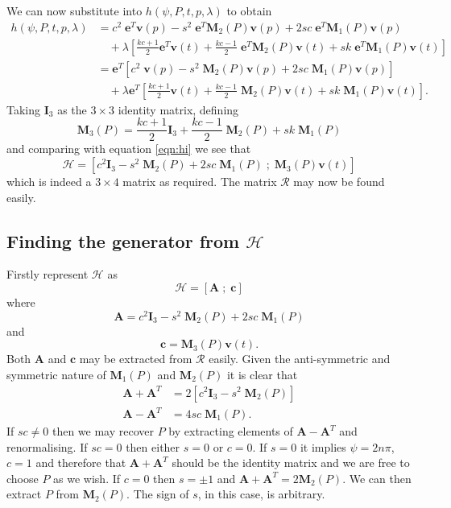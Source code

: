 We can now substitute into $h(\psi, P, t, p,\lambda)$ to obtain
\begin{align*}
h(\psi, P, t, p, \lambda) &= c^2\;\mathbf{e}^T\mathbf{v}(p) - s^2\;\mathbf{e}^T\mathbf{M}_2(P)\mathbf{v}(p) + 2sc\;\mathbf{e}^T\mathbf{M}_1(P)\mathbf{v}(p) \\
&\quad+ \lambda\left[ 
 \frac{kc+1}{2} \mathbf{e}^T\mathbf{v}(t) + \frac{kc-1}{2} \;\mathbf{e}^T\mathbf{M}_2(P)\mathbf{v}(t)
+ sk\;\mathbf{e}^T\mathbf{M}_1(P)\mathbf{v}(t)
 \right] \\
& = \mathbf{e}^T \left[ 
 c^2\;\mathbf{v}(p) - s^2\;\mathbf{M}_2(P)\mathbf{v}(p) + 2sc\;\mathbf{M}_1(P)\mathbf{v}(p) 
\right] \\
&\quad+ \lambda\mathbf{e}^T\left[ 
 \frac{kc+1}{2} \mathbf{v}(t) + \frac{kc-1}{2} \;\mathbf{M}_2(P)\mathbf{v}(t)
+ sk\;\mathbf{M}_1(P)\mathbf{v}(t)
 \right].
\end{align*}
Taking $\mathbf{I}_3$ as the $3\times3$ identity matrix, defining
\[
\mathbf{M}_3(P) = \frac{kc+1}{2} \mathbf{I}_3 
+ \frac{kc-1}{2} \;\mathbf{M}_2(P) + sk\;\mathbf{M}_1(P)
\]
and comparing with 
equation \ref{eqn:hi} we see that
\[
\mathcal{H} = \left[
 c^2\mathbf{I}_3 - s^2\;\mathbf{M}_2(P) + 2sc\;\mathbf{M}_1(P) \; ; \;
 \mathbf{M}_3(P)\mathbf{v}(t)
\right]
\]
which is indeed a $3\times4$ matrix as required. The matrix $\mathcal{R}$ may
now be found easily.

\subsection{Finding the generator from $\mathcal{H}$}

Firstly represent $\mathcal{H}$ as
\[
\mathcal{H} = [ \mathbf{A}\; ; \; \mathbf{c} ]
\]
where 
\[\mathbf{A} = c^2\mathbf{I}_3 - s^2\;\mathbf{M}_2(P) + 2sc\;\mathbf{M}_1(P)\]
and
\begin{equation}
\mathbf{c} = \mathbf{M}_3(P)\mathbf{v}(t). \label{eqn:b}
\end{equation}
Both $\mathbf{A}$ and $\mathbf{c}$ may be extracted from $\mathcal{R}$ easily.
Given the anti-symmetric and symmetric nature
of $\mathbf{M}_1(P)$ and $\mathbf{M}_2(P)$ it is clear that
\begin{align*}
\mathbf{A} + \mathbf{A}^T &= 
2\left[ c^2\mathbf{I}_3 - s^2\;\mathbf{M}_2(P) \right] \\
\mathbf{A} - \mathbf{A}^T &= 
4sc\;\mathbf{M}_1(P).
\end{align*}
If $sc \ne 0$ then we may recover $P$ by extracting elements of 
$\mathbf{A} - \mathbf{A}^{T}$ and renormalising. If $sc = 0$ then either
$s = 0$ or $c = 0$. If $s = 0$ it implies $\psi = 2n\pi$, $c = 1$ and 
therefore that 
$\mathbf{A} + \mathbf{A}^{T}$ should be the identity matrix and
we are free to choose $P$ as we wish. If $c = 0$ then $s = \pm 1$
and $\mathbf{A} + \mathbf{A}^{T} = 2 \mathbf{M}_2(P)$. We can then
extract $P$ from $\mathbf{M}_2(P)$. The sign of $s$, in this case, is arbitrary.

